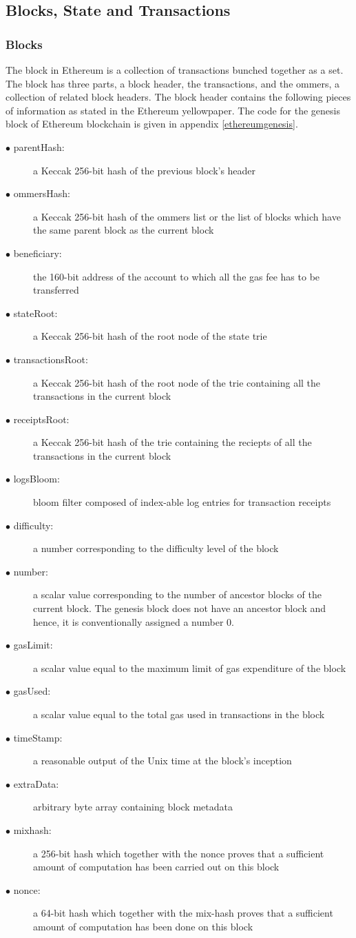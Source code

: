 \documentclass[a4paper,twoside,phd]{BYUPhys}
\begin{document}
\subsection{Blocks, State and Transactions}
\subsubsection{Blocks}
The block in Ethereum is a collection of transactions bunched together as a set\cite{ButerinAPLATFORM}. The block has three parts, a block header, the transactions, and the ommers, a collection of related block headers\cite{Wood2018ETHEREUM:LEDGER}. The block header contains the following pieces of information as stated in the Ethereum yellowpaper\cite{Wood2018ETHEREUM:LEDGER}. The code for the genesis block of Ethereum blockchain is given in appendix \ref{ethereumgenesis}. 
\begin{description}
\item[$\bullet$ parentHash:] a Keccak 256-bit hash of the previous block's header
\item[$\bullet$ ommersHash:] a Keccak 256-bit hash of the ommers list or the list of blocks which have the same parent block as the current block
\item[$\bullet$ beneficiary:] the 160-bit address of the account to which all the gas fee has to be transferred
\item[$\bullet$ stateRoot:] a Keccak 256-bit hash of the root node of the state trie
\item[$\bullet$ transactionsRoot:] a Keccak 256-bit hash of the root node of the trie containing all the transactions in the current block
\item[$\bullet$ receiptsRoot:] a Keccak 256-bit hash of the trie containing the reciepts of all the transactions in the current block
\item[$\bullet$ logsBloom:] bloom filter composed of index-able log entries for transaction receipts
\item[$\bullet$ difficulty:] a number corresponding to the difficulty level of the block
\item[$\bullet$ number:] a scalar value corresponding to the number of ancestor blocks of the current block. The genesis block does not have an ancestor block and hence, it is conventionally assigned a number 0.
\item[$\bullet$ gasLimit:] a scalar value equal to the maximum limit of gas expenditure of the block
\item[$\bullet$ gasUsed:] a scalar value equal to the total gas used in transactions in the block
\item[$\bullet$ timeStamp:] a reasonable output of the Unix time at the block's inception
\item[$\bullet$ extraData:] arbitrary byte array containing block metadata
\item[$\bullet$ mixhash:] a 256-bit hash which together with the nonce proves that a sufficient amount of computation has been carried out on this block
\item[$\bullet$ nonce:] a 64-bit hash which together with the mix-hash proves that a sufficient amount of computation has been done on this block
\end{description}
\end{document}
